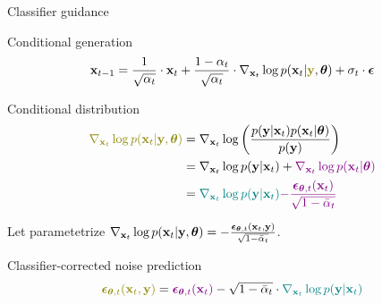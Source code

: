 \begin{frame}{Classifier guidance}
	\begin{block}{Conditional generation}
		\vspace{-0.3cm}
		\[
			\bx_{t - 1} = \frac{1}{\sqrt{\alpha_t}} \cdot \bx_t + \frac{1 - \alpha_t}{\sqrt{\alpha_t}} \cdot  \nabla_{\bx_t} \log p(\bx_t | {\color{olive}\by}, \btheta) +  \sigma_t \cdot \bepsilon
		\]
		\vspace{-0.5cm}
	\end{block}
	\begin{block}{Conditional distribution}
		\vspace{-0.7cm}
		\begin{align*}
			{\color{olive}\nabla_{\bx_t} \log p(\bx_t | \by, \btheta)} &= \nabla_{\bx_t} \log \left(\frac{p(\by | \bx_t)p(\bx_t | \btheta)}{p(\by)} \right)\\
			&= \nabla_{\bx_t} \log p(\by | \bx_t) + {\color{violet}\nabla_{\bx_t} \log p(\bx_t | \btheta)}\\
			&= {\color{teal}\nabla_{\bx_t} \log p(\by | \bx_t)} {\color{violet}- \frac{\bepsilon_{\btheta, t}(\bx_t)}{\sqrt{1 - \bar{\alpha}_t}}}
		\end{align*}
		\vspace{-0.5cm}
	\end{block}
	Let parametetrize $\nabla_{\mathbf{x}_t} \log p(\mathbf{x}_t | \mathbf{y}, \boldsymbol{\theta}) = - \frac{\boldsymbol{\epsilon}_{\boldsymbol{\theta}, t}(\mathbf{x}_t, \mathbf{y})}{\sqrt{1 - \bar{\alpha}_t}}$.
	\begin{block}{Classifier-corrected noise prediction}
		\vspace{-0.3cm}
		\[
			{\color{olive}\bepsilon_{\btheta, t}(\bx_t, \by)} = {\color{violet}\bepsilon_{\btheta, t}(\bx_t)} - \sqrt{1 - \bar{\alpha}_t} \cdot {\color{teal}\nabla_{\bx_t} \log p(\by | \bx_t)}
		\]
	\end{block}
\end{frame}
